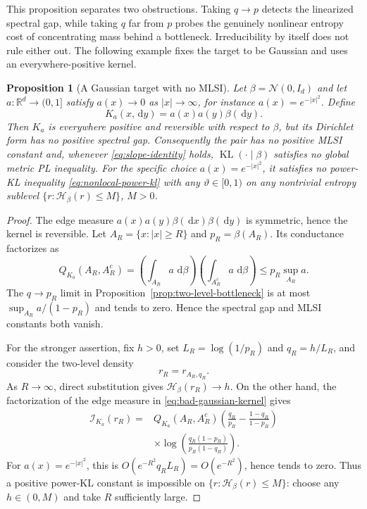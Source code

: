 \documentclass[11pt]{article}
\newtheorem{proposition}[theorem]{Proposition}
\theoremstyle{definition}
\DeclareMathOperator{\KL}{KL}
\newcommand{\R}{\mathbb R}
\newcommand{\dd}{\,\mathrm d}
\newcommand{\cI}{\mathcal I}
\newcommand{\cH}{\mathcal H}
\newcommand{\abs}[1]{\left\lvert #1\right\rvert}
\begin{document}
This proposition separates two obstructions.  Taking $q\to p$ detects the
linearized spectral gap, while taking $q$ far from $p$ probes the genuinely
nonlinear entropy cost of concentrating mass behind a bottleneck.
Irreducibility by itself does not rule either out.  The following example
fixes the target to be Gaussian and uses an everywhere-positive kernel.

\begin{proposition}[A Gaussian target with no MLSI]
\label{prop:gaussian-bad-kernel}
Let $\beta=\mathcal N(0,I_d)$ and let $a:\R^d\to(0,1]$ satisfy
$a(x)\to0$ as $\abs x\to\infty$, for instance
$a(x)=e^{-\abs x^2}$.  Define
\begin{equation}\label{eq:bad-gaussian-kernel}
  K_a(x,\dd y)=a(x)a(y)\beta(\dd y).
\end{equation}
Then $K_a$ is everywhere positive and reversible with respect to $\beta$,
but its Dirichlet form has no positive spectral gap.  Consequently the pair
has no positive MLSI constant and, whenever \eqref{eq:slope-identity} holds,
$\KL(\cdot\mid\beta)$ satisfies no global metric PL inequality.  For the
specific choice $a(x)=e^{-\abs x^2}$, it satisfies no power-KL inequality
\eqref{eq:nonlocal-power-kl} with any $\vartheta\in[0,1)$ on any nontrivial
entropy sublevel $\{r:\cH_\beta(r)\leq M\}$, $M>0$.
\end{proposition}

\begin{proof}
The edge measure
$a(x)a(y)\beta(\dd x)\beta(\dd y)$ is symmetric, hence the kernel is
reversible.  Let $A_R=\{x:\abs x\geq R\}$ and $p_R=\beta(A_R)$.  Its
conductance factorizes as
\[
  Q_{K_a}(A_R,A_R^c)
  =\left(\int_{A_R}a\,\dd\beta\right)
   \left(\int_{A_R^c}a\,\dd\beta\right)
  \leq p_R\sup_{A_R}a.
\]
The $q\to p_R$ limit in Proposition~\ref{prop:two-level-bottleneck} is at
most $\sup_{A_R}a/(1-p_R)$ and tends to zero.  Hence the spectral gap and
MLSI constants both vanish.

For the stronger assertion, fix $h>0$, set
$L_R=\log(1/p_R)$ and $q_R=h/L_R$, and consider the two-level density
\[
  r_R=r_{A_R,q_R}.
\]
As $R\to\infty$, direct substitution gives
$\cH_\beta(r_R)\to h$.  On the other hand, the factorization of the edge
measure in \eqref{eq:bad-gaussian-kernel} gives
\begin{align*}
  \cI_{K_a}(r_R)
  ={}&Q_{K_a}(A_R,A_R^c)
      \left(\frac{q_R}{p_R}-\frac{1-q_R}{1-p_R}\right)\\
     &\times
      \log\!\left(\frac{q_R(1-p_R)}{p_R(1-q_R)}\right).
\end{align*}
For $a(x)=e^{-\abs x^2}$, this is
$O(e^{-R^2}q_RL_R)=O(e^{-R^2})$, hence tends to zero.  Thus a positive
power-KL constant is impossible on $\{r:\cH_\beta(r)\leq M\}$: choose any
$h\in(0,M)$ and take $R$ sufficiently large.
\end{proof}
\end{document}
